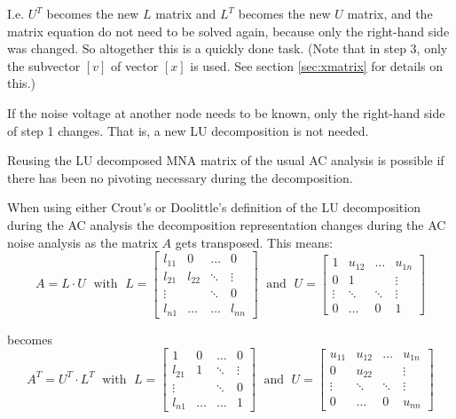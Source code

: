 I.e. $U^T$ becomes the new $L$ matrix and $L^T$ becomes the new $U$
matrix, and the matrix equation do not need to be solved again, because
only the right-hand side was changed.  So altogether this is a quickly
done task.  (Note that in step 3, only the subvector $[v]$ of vector
$[x]$ is used.  See section \ref{sec:xmatrix} for details on this.)

\addvspace{12pt}

If the noise voltage at another node needs to be known, only the
right-hand side of step 1 changes.  That is, a new LU decomposition is
not needed.

\addvspace{12pt}

Reusing the LU decomposed MNA matrix of the usual AC analysis is
possible if there has been no pivoting necessary during the
decomposition.

\addvspace{12pt}

When using either Crout's or Doolittle's definition of the LU
decomposition during the AC analysis the decomposition representation
changes during the AC noise analysis as the matrix $A$ gets
transposed.  This means:
\begin{equation}
A = L\cdot U \;\text{ with }\;
L = 
\begin{bmatrix}
l_{11} & 0 & \ldots & 0\\
l_{21} & l_{22} & \ddots & \vdots\\
\vdots &  & \ddots & 0\\
l_{n1} & \ldots & \ldots & l_{nn}
\end{bmatrix}
\;\text{ and }\;
U =
\begin{bmatrix}
1 & u_{12} & \ldots & u_{1n}\\
0 & 1 &  & \vdots\\
\vdots & \ddots & \ddots & \vdots\\
0 & \ldots & 0 & 1
\end{bmatrix}
\end{equation}

becomes
\begin{equation}
A^T = U^T\cdot L^T \;\text{ with }\;
L = 
\begin{bmatrix}
1 & 0 & \ldots & 0\\
l_{21} & 1 & \ddots & \vdots\\
\vdots &  & \ddots & 0\\
l_{n1} & \ldots & \ldots & 1
\end{bmatrix}
\;\text{ and }\;
U =
\begin{bmatrix}
u_{11} & u_{12} & \ldots & u_{1n}\\
0 & u_{22} &  & \vdots\\
\vdots & \ddots & \ddots & \vdots\\
0 & \ldots & 0 & u_{nn}
\end{bmatrix}
\end{equation}

